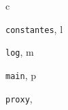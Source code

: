 \documentclass[letterpaper,10pt,french]{sphinxmanual}
\begin{document}
\renewcommand{\indexname}{Index des modules Python}
\begin{theindex}
\def\bigletter#1{{\Large\sffamily#1}\nopagebreak\vspace{1mm}}
\bigletter{c}
\item {\texttt{constantes}}, \pageref{constantes:module-constantes}
\indexspace
\bigletter{l}
\item {\texttt{log}}, \pageref{log:module-log}
\indexspace
\bigletter{m}
\item {\texttt{main}}, \pageref{main:module-main}
\indexspace
\bigletter{p}
\item {\texttt{proxy}}, \pageref{proxy:module-proxy}
\end{theindex}

\renewcommand{\indexname}{Index}
\printindex
\end{document}
